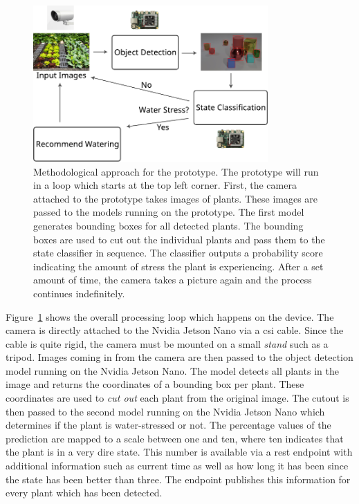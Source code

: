 \documentclass[draft,final]{vutinfth} %
\begin{document}
\begin{figure}
  \centering
  \includegraphics[width=0.8\textwidth]{graphics/setup.pdf}
  \caption[Methodological approach for the prototype.]{Methodological
    approach for the prototype. The prototype will run in a loop which
    starts at the top left corner. First, the camera attached to the
    prototype takes images of plants. These images are passed to the
    models running on the prototype. The first model generates
    bounding boxes for all detected plants. The bounding boxes are
    used to cut out the individual plants and pass them to the state
    classifier in sequence. The classifier outputs a probability score
    indicating the amount of stress the plant is experiencing. After a
    set amount of time, the camera takes a picture again and the
    process continues indefinitely.}
  \label{fig:setup}
\end{figure}

Figure~\ref{fig:setup} shows the overall processing loop which happens
on the device. The camera is directly attached to the Nvidia Jetson
Nano via a \gls{csi} cable. Since the cable is quite rigid, the camera
must be mounted on a small \emph{stand} such as a tripod. Images
coming in from the camera are then passed to the object detection
model running on the Nvidia Jetson Nano. The model detects all plants
in the image and returns the coordinates of a bounding box per
plant. These coordinates are used to \emph{cut out} each plant from
the original image. The cutout is then passed to the second model
running on the Nvidia Jetson Nano which determines if the plant is
water-stressed or not. The percentage values of the prediction are
mapped to a scale between one and ten, where ten indicates that the
plant is in a very dire state. This number is available via a
\gls{rest} endpoint with additional information such as current time
as well as how long it has been since the state has been better than
three. The endpoint publishes this information for every plant which
has been detected.
\end{document}
